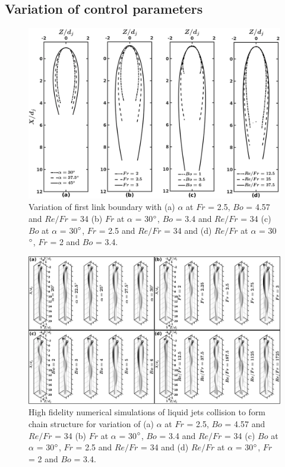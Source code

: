 \subsection{Variation of control parameters}
\begin{figure}
	\centering
	\includegraphics[width=\linewidth]{chapters/finalContour}
	\caption{Variation of first link boundary with (a) $\alpha$ at $Fr$ = 2.5, $Bo$ = 4.57 and $Re/Fr$ = 34 (b) $Fr$ at $\alpha$ = 30$\degree$, $Bo$ = 3.4 and $Re/Fr$ = 34 (c) $Bo$ at $\alpha$ = 30$\degree$, $Fr$ = 2.5 and $Re/Fr$ = 34 and (d) $Re/Fr$ at $\alpha$ = 30$\degree$, $Fr$ = 2 and $Bo$ = 3.4.}
	\label{Figure::phaseContoursLink1}
\end{figure}
\begin{figure}
	\centering
	\includegraphics[width=\linewidth]{chapters/Figure8}
	\caption{High fidelity numerical simulations of liquid jets collision to form chain structure for variation of (a) $\alpha$ at $Fr$ = 2.5, $Bo$ = 4.57 and $Re/Fr$ = 34 (b) $Fr$ at $\alpha$ = 30$\degree$, $Bo$ = 3.4 and $Re/Fr$ = 34 (c) $Bo$ at $\alpha$ = 30$\degree$, $Fr$ = 2.5 and $Re/Fr$ = 34 and (d) $Re/Fr$ at $\alpha$ = 30$\degree$, $Fr$ = 2 and $Bo$ = 3.4.}
	\label{Figure::phaseContours}
\end{figure}
